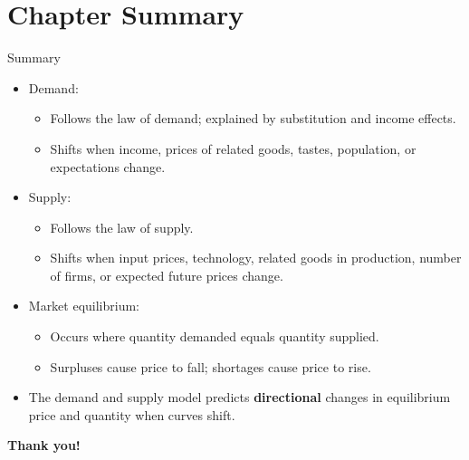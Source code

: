 \documentclass[aspectratio=169]{beamer}
\begin{document}
\section{Chapter Summary}

\begin{frame}{Summary}
\transfade
\begin{itemize}
  \item Demand:
  \begin{itemize}
    \item Follows the law of demand; explained by substitution and income effects.
    \item Shifts when income, prices of related goods, tastes, population, or expectations change.
  \end{itemize}
  \item Supply:
  \begin{itemize}
    \item Follows the law of supply.
    \item Shifts when input prices, technology, related goods in production, number of firms, or expected future prices change.
  \end{itemize}
  \item Market equilibrium:
  \begin{itemize}
    \item Occurs where quantity demanded equals quantity supplied.
    \item Surpluses cause price to fall; shortages cause price to rise.
  \end{itemize}
  \item The demand and supply model predicts \textbf{directional} changes in equilibrium price and quantity when curves shift.
\end{itemize}
\end{frame}

\begin{frame}
\centering
\Huge \textbf{Thank you!}
\end{frame}
\end{document}
